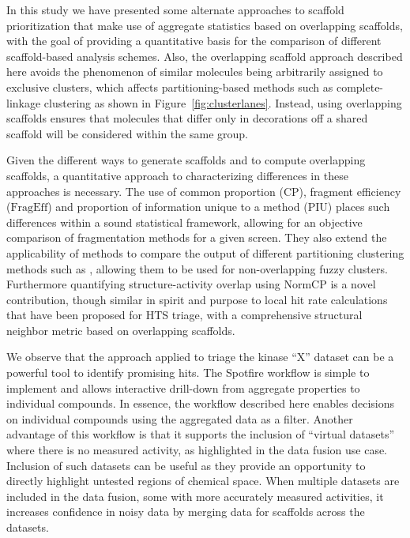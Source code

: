 \documentclass[journal=jacsat,manuscript=article]{achemso}
\newcommand*\fref[1]{Figure~\ref{fig:#1}}
\begin{document}
In this study we have presented some alternate approaches to scaffold
prioritization that make use of aggregate statistics based on
overlapping scaffolds, with the goal of providing a quantitative basis
for the comparison of different scaffold-based analysis schemes.
Also, the overlapping scaffold approach described here
avoids the phenomenon of similar molecules being arbitrarily assigned to
exclusive clusters, which affects partitioning-based methods such as
complete-linkage clustering as shown in \fref{clusterlanes}.
Instead, using overlapping scaffolds ensures that
molecules that differ only in decorations off a shared scaffold
will be considered within the same group.

Given the different ways to generate scaffolds and to compute
overlapping scaffolds, a quantitative approach to characterizing
differences in these approaches is necessary. The use of common
proportion ($\textrm{CP}$), fragment efficiency ($\textrm{FragEff}$)
and proportion of information unique to a method ($\textrm{PIU}$) 
places such differences within a sound statistical framework, allowing
for an objective comparison of fragmentation methods for a given
screen. They also extend the applicability of
methods to compare the output of different partitioning clustering
methods such as \citet{Torres2009}, allowing them to be used for
non-overlapping fuzzy clusters. Furthermore quantifying
structure-activity overlap using $\textrm{NormCP}$ is a novel
contribution, though similar in spirit and purpose to local hit rate
calculations that have been proposed for HTS triage\cite{Posner2009},
with a comprehensive structural neighbor metric based on overlapping
scaffolds.

We observe that the approach applied to triage the kinase ``X'' dataset
can be a powerful tool to identify promising hits.  The Spotfire workflow
is simple to implement and allows interactive drill-down from
aggregate properties to individual compounds. In essence,
the workflow described here enables decisions on individual compounds
using the aggregated data as a filter. Another advantage of this
workflow is that it supports the inclusion of ``virtual
datasets'' where there is no measured activity, as highlighted in the
data fusion use case.  Inclusion of such datasets can be useful as
they provide an opportunity to directly highlight untested regions of
chemical space. When multiple datasets are included in the data fusion, 
some with more accurately measured activities, it increases
confidence in noisy data by merging data for scaffolds across the
datasets.
\end{document}

